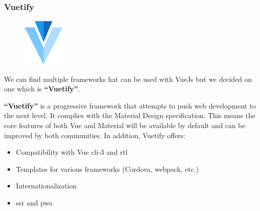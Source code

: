 \documentclass[12pt,a4paper]{report}
\begin{document}
	\subsubsection*{Vuetify}
	\begin{figure}
		\centering
		\includegraphics[width=0.8in]{vuetify-logo.png}	
		
	\end{figure}
	We can find multiple frameworks hat can be used with VueJs but we decided on one which is   \textbf{``Vuetify''}.\par 
	\textbf{``Vuetify''} is a progressive framework that attempts to push web development to the next level. It complies with the Material Design specification. This means the core features of both Vue and Material will be available by default and can be improved by both communities. In addition, Vuetify offers:
	\begin{itemize}
		\item Compatibility with Vue \ac{cli}-3 and \ac{rtl} 
		\item Templates for various frameworks (Cordova, webpack, etc.)
		\item Internationalization
		\item  \ac{ssr} and  \ac{pwa} 
		
	\end{itemize}
\end{document}
